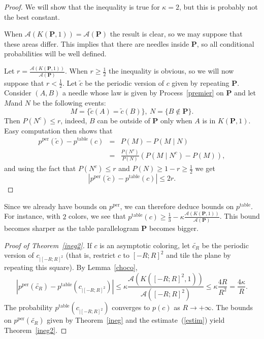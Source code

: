 \documentclass[a4paper,11pt]{article}
\theoremstyle{definition}
\theoremstyle{remark}
\renewcommand{\P}{\mathbf{P}}
\newcommand{\pper}{p^{\mathrm{per}}}
\newcommand{\ptable}{p^{\mathrm{table}}}
\begin{document}
\begin{proof}
We will show that the inequality is true for $\kappa =2$, but this is probably 
not the best constant.

When $\mathcal{A}(K(\mathbf{P},1)) = \mathcal{A}(\mathbf{P})$ the result is clear,
so we may suppose that these areas differ. This implies that there are needles 
inside $\P$, so all conditional probabilities will be well defined.

Let $r = \frac{\mathcal{A}(K(\mathbf{P},1))}{\mathcal{A}(\mathbf{P})}$. When 
$r \geq \frac12$ the inequality is obvious, so we will now suppose that 
$r < \frac12$. Let $\tilde{c}$ be the periodic version of
$c$ given by repeating $\P$. Consider $(A,B)$ a needle whose law is given by Process~\ref{premier} on $\P$ and let $M$and $N$ be the following events:
$$ M = \{\tilde{c} (A) = \tilde{c} (B) \}, \ N = \{B\notin \P \}.$$
Then $P(N^c) \leq r$, indeed, $B$ can 
be outside of $\mathbf{P}$ only
when $A$ is in $K(\mathbf{P},1)$. Easy computation then shows that
\begin{eqnarray*}
\pper(\tilde{c}) - \ptable(c) & = & P(M) - P(M \mid N) \\
& = & \frac{P(N^c)}{P(N)} \left( P(M\mid N^c) - P(M)\right),
\end{eqnarray*}
and using the fact that $P(N^c) \leq r$ and 
$P(N) \geq 1-r \geq \frac12$ we get 
$$ |\pper(\tilde{c}) - \ptable(c)| \leq 2r.$$
\end{proof}

Since we already have bounds on $\pper$, we can therefore deduce bounds on $\ptable$.
For instance, with $2$ colors, we see that 
$\ptable(c) \geq \frac13 - \kappa \frac{\mathcal{A}(K(\mathbf{P},1))}{\mathcal{A}(\mathbf{P})}$. 
This bound becomes sharper as the table parallelogram $\mathbf{P}$ becomes bigger.
\begin{proof}[Proof of Theorem~\ref{ineg2}]
If $c$ is an asymptotic coloring, let $\tilde{c_R}$ be the periodic version of $c_{|[-R;R]^2}$ (that is, restrict $c$ to $[-R;R]^2$ and tile the plane by repeating this square). By Lemma~\ref{choco},
\begin{equation} \label{estim}
|\pper(\tilde{c_R}) - \ptable(c_{|[-R;R]^2}) | \leq \kappa \frac{\mathcal{A}(K([-R;R]^2,1))}{\mathcal{A}([-R;R]^2)} \leq \kappa \frac{4R}{R^2} = \frac{4\kappa}{R}.
\end{equation}
The probability $\ptable(c_{|[-R;R]^2})$ converges to $p(c)$ as $R\rightarrow +\infty$. The bounds on $\pper(\tilde{c_R})$ given by Theorem~\ref{ineg} and the estimate~(\ref{estim}) yield Theorem~\ref{ineg2}.
\end{proof}
\end{document}
